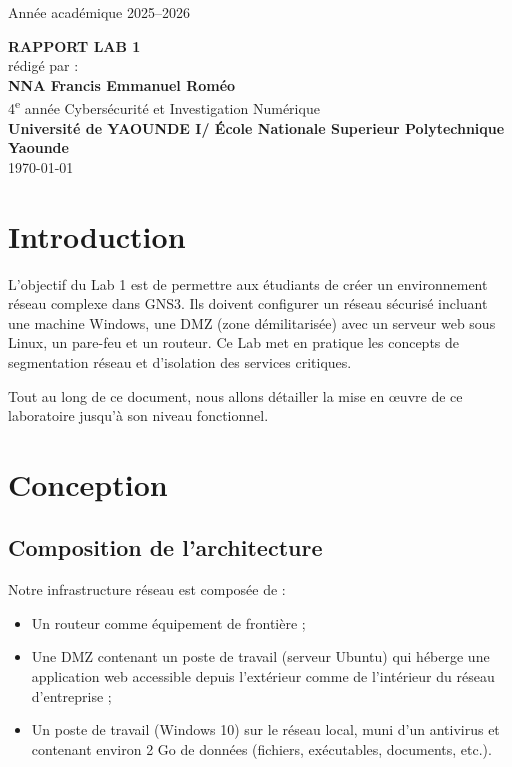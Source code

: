 \documentclass[12pt,a4paper]{report}
\begin{document}
\begin{titlepage}
\centering
\vspace*{3cm}

{\Large Année académique 2025--2026\\[1.5cm]}

{\Huge \textbf{RAPPORT LAB 1}}\\[1cm]

{\large rédigé par :}\\[0.5cm]
{\Large \textbf{NNA Francis Emmanuel Roméo}}\\[0.5cm]
{\large 4\textsuperscript{e} année Cybersécurité et Investigation Numérique}\\[2cm]


\vfill
\textbf{Université  de YAOUNDE I/ École Nationale Superieur Polytechnique Yaounde}\\[0.2cm]
\today

\end{titlepage}

\tableofcontents
\newpage

\chapter*{Introduction}

L'objectif du Lab 1 est de permettre aux étudiants de créer un environnement réseau complexe dans GNS3. 
Ils doivent configurer un réseau sécurisé incluant une machine Windows, une DMZ (zone démilitarisée) 
avec un serveur web sous Linux, un pare-feu et un routeur. 
Ce Lab met en pratique les concepts de segmentation réseau et d'isolation des services critiques. 

Tout au long de ce document, nous allons détailler la mise en œuvre de ce laboratoire jusqu’à son niveau fonctionnel.

\chapter{Conception}

\section{Composition de l’architecture}
Notre infrastructure réseau est composée de :
\begin{itemize}
    \item Un routeur comme équipement de frontière ;
    \item Une DMZ contenant un poste de travail (serveur Ubuntu) qui héberge une application web accessible depuis l’extérieur comme de l’intérieur du réseau d’entreprise ;
    \item Un poste de travail (Windows 10) sur le réseau local, muni d’un antivirus et contenant environ 2 Go de données (fichiers, exécutables, documents, etc.).
\end{itemize}
\end{document}
